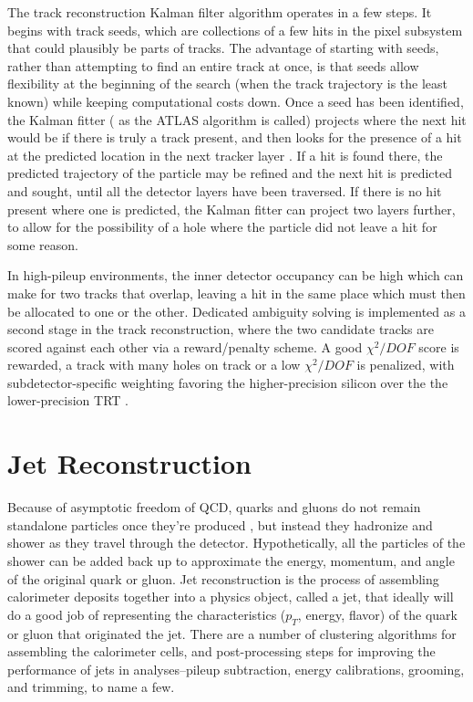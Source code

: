 The track reconstruction Kalman filter algorithm operates in a few steps.  It begins with track seeds, which are collections of a few hits in the pixel subsystem that could plausibly be 
parts of tracks.  The advantage of starting with seeds, rather than attempting to find an entire track at 
once, is that seeds allow flexibility at the beginning of the search (when the track trajectory is the 
least known) while keeping computational costs down.  Once a seed has been identified, the Kalman fitter (
as the ATLAS algorithm is called) projects where the next hit would be if there is truly a track 
present, and then looks for the presence of a hit at the predicted location in the next tracker layer
.  If a hit is found there, the predicted trajectory of the particle may be refined and the next 
hit is predicted and sought, until all the detector layers have been traversed. If there is no hit 
present where one is predicted, the Kalman fitter can project two layers further, to allow for the possibility 
of a hole where the particle did not leave a hit for some reason. 

In high-pileup environments, the inner detector occupancy can be high which can make for two tracks that 
overlap, leaving a hit in the same place which must then be allocated to one or the other.  
Dedicated ambiguity solving is implemented as a second stage in the track reconstruction, where the two candidate tracks are 
scored against each other via a reward/penalty scheme.  A good $\chi^2/DOF$ 
score is rewarded, a track with many holes on track or a low $\chi^2/DOF$ 
is penalized, with subdetector-specific weighting favoring the higher-precision silicon over the the lower-precision TRT \cite{newt}. 



\section{Jet Reconstruction}
\label{sec:jet_reco}
Because of asymptotic freedom of QCD, quarks and gluons do not remain standalone particles once they're produced
, but instead they hadronize and shower as they travel through the detector.  Hypothetically, all the particles of 
the shower can be added back up to approximate the energy, momentum, and angle of the original quark 
or gluon.  Jet reconstruction is the process of assembling calorimeter deposits together into a physics object, called a 
jet, that ideally will do a good job of representing the characteristics ($p_T$, energy, 
flavor) of the quark or gluon that originated the jet.  There are a number of clustering algorithms for 
assembling the calorimeter cells, and post-processing steps for improving the performance of jets in analyses--pileup 
subtraction, energy calibrations, grooming, and trimming, to name a few.  

